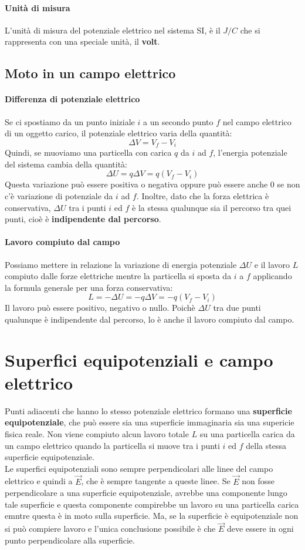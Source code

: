 \documentclass[12pt]{report}
\begin{document}
	\paragraph{Unità di misura} L'unità di misura del potenziale elettrico nel sistema SI, è il $J/C$ che si rappresenta con una speciale unità, il \textbf{volt}.
	\subsection{Moto in un campo elettrico}
	\paragraph{Differenza di potenziale elettrico} Se ci spostiamo da un punto iniziale $i$ a un secondo punto $f$ nel campo elettrico di un oggetto carico, il potenziale elettrico varia della quantità:
	\[
	\Delta V = V_f - V_i
	\]
	Quindi, se muoviamo una particella con carica $q$ da $i$ ad $f$, l'energia potenziale del sistema cambia della quantità:
	\[
	\Delta U = q\Delta V = q(V_f - V_i)
	\]
	Questa variazione può essere positiva o negativa oppure può essere anche 0 se non c'è variazione di potenziale da $i$ ad $f$. Inoltre, dato che la forza elettrica è conservativa, $\Delta U$ tra i punti $i$ ed $f$ è la stessa qualunque sia il percorso tra quei punti, cioè è \textbf{indipendente dal percorso}.
	\paragraph{Lavoro compiuto dal campo} Possiamo mettere in relazione la variazione di energia potenziale $\Delta U$ e il lavoro $L$ compiuto dalle forze elettriche mentre la particella si sposta da $i$ a $f$ applicando la formula generale per una forza conservativa:
	\[
	L = -\Delta U = -q\Delta V = -q(V_f - V_i)
	\]
	Il lavoro può essere positivo, negativo o nullo. Poichè $\Delta U$ tra due punti qualunque è indipendente dal percorso, lo è anche il lavoro compiuto dal campo.
	\section{Superfici equipotenziali e campo elettrico}
	Punti adiacenti che hanno lo stesso potenziale elettrico formano una \textbf{superficie equipotenziale}, che può essere sia una superficie immaginaria sia una supericie fisica reale. Non viene compiuto alcun lavoro totale $L$ su una particella carica da un campo elettrico quando la particella si muove tra i punti $i$ ed $f$ della stessa superficie equipotenziale. \\
	Le superfici equipotenziali sono sempre perpendicolari alle linee del campo elettrico e quindi a $\vec{E}$, che è sempre tangente a queste linee. Se $\vec{E}$ non fosse perpendicolare a una superficie equipotenziale, avrebbe una componente lungo tale superficie e questa componente compirebbe un lavoro su una particella carica emntre questa è in moto sulla superficie. Ma, se la superficie è equipotenziale non si può compiere lavoro e l'unica conclusione possibile è che $\vec{E}$ deve essere in ogni punto perpendicolare alla superficie.
\end{document}
